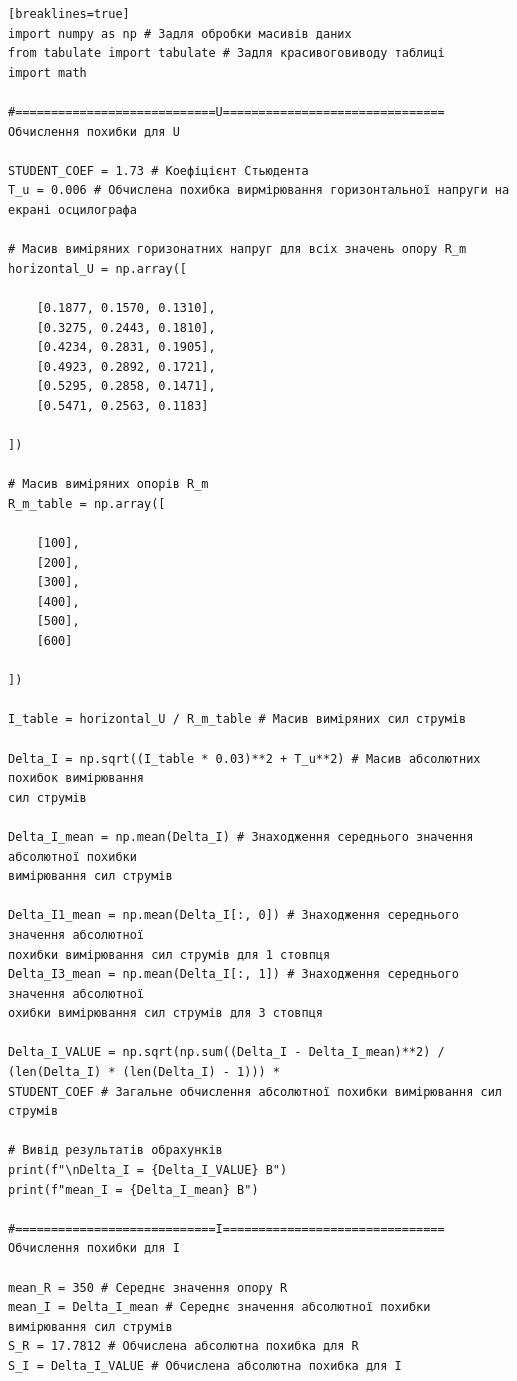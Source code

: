 \documentclass[12pt,a4paper]{article}
\begin{document}
    \small{

    \begin{verbatim}[breaklines=true]
import numpy as np # Задля обробки масивів даних
from tabulate import tabulate # Задля красивоговиводу таблиці
import math

#============================U===============================
Обчислення похибки для U

STUDENT_COEF = 1.73 # Коефіцієнт Стьюдента
T_u = 0.006 # Обчислена похибка вирмірювання горизонтальної напруги на екрані осцилографа

# Масив виміряних горизонатних напруг для всіх значень опору R_m
horizontal_U = np.array([

    [0.1877, 0.1570, 0.1310],
    [0.3275, 0.2443, 0.1810],
    [0.4234, 0.2831, 0.1905],
    [0.4923, 0.2892, 0.1721],
    [0.5295, 0.2858, 0.1471],
    [0.5471, 0.2563, 0.1183]

])

# Масив виміряних опорів R_m
R_m_table = np.array([

    [100],
    [200],
    [300],
    [400],
    [500],
    [600]

])

I_table = horizontal_U / R_m_table # Масив виміряних сил струмів

Delta_I = np.sqrt((I_table * 0.03)**2 + T_u**2) # Масив абсолютних похибок вимірювання
сил струмів

Delta_I_mean = np.mean(Delta_I) # Знаходження середнього значення абсолютної похибки
вимірювання сил струмів

Delta_I1_mean = np.mean(Delta_I[:, 0]) # Знаходження середнього значення абсолютної
похибки вимірювання сил струмів для 1 стовпця
Delta_I3_mean = np.mean(Delta_I[:, 1]) # Знаходження середнього значення абсолютної 
охибки вимірювання сил струмів для 3 стовпця

Delta_I_VALUE = np.sqrt(np.sum((Delta_I - Delta_I_mean)**2) /
(len(Delta_I) * (len(Delta_I) - 1))) *
STUDENT_COEF # Загальне обчислення абсолютної похибки вимірювання сил струмів

# Вивід результатів обрахунків
print(f"\nDelta_I = {Delta_I_VALUE} В")
print(f"mean_I = {Delta_I_mean} В")

#============================I===============================
Обчислення похибки для I

mean_R = 350 # Середнє значення опору R
mean_I = Delta_I_mean # Середнє значення абсолютної похибки вимірювання сил струмів
S_R = 17.7812 # Обчислена абсолютна похибка для R
S_I = Delta_I_VALUE # Обчислена абсолютна похибка для I


\end{verbatim}}
\end{document}
